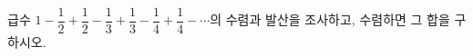 급수 $1-\dfrac{1}{2}+\dfrac{1}{2}-\dfrac{1}{3}+\dfrac{1}{3}-\dfrac{1}{4}+\dfrac{1}{4}-\cdots$의 수렴과 발산을 조사하고, 수렴하면 그 합을 구하시오.
